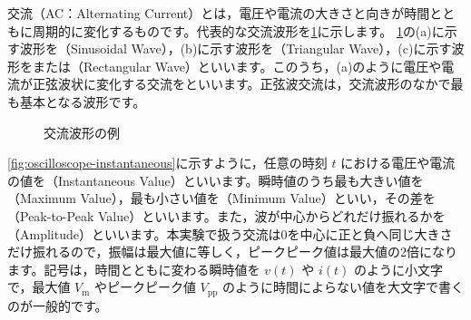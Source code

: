 交流（AC：Alternating Current）とは，電圧や電流の大きさと向きが時間とともに周期的に変化するものです。代表的な交流波形を\cref{fig:oscilloscope-waveforms}に示します。
\cref{fig:oscilloscope-waveforms}の(a)に示す波形を（Sinusoidal Wave），(b)に示す波形を（Triangular Wave），(c)に示す波形をまたは（Rectangular Wave）といいます。このうち，(a)のように電圧や電流が正弦波状に変化する交流をといいます。正弦波交流は，交流波形のなかで最も基本となる波形です。

\begin{figure}[htbp]
  \centering
  \caption{交流波形の例}
  \label{fig:oscilloscope-waveforms}
\end{figure}

\cref{fig:oscilloscope-instantaneous}に示すように，任意の時刻 $t$ における電圧や電流の値を（Instantaneous Value）といいます。瞬時値のうち最も大きい値を（Maximum Value），最も小さい値を（Minimum Value）といい，その差を（Peak-to-Peak Value）といいます。また，波が中心からどれだけ振れるかを（Amplitude）といいます。本実験で扱う交流は0を中心に正と負へ同じ大きさだけ振れるので，振幅は最大値に等しく，ピークピーク値は最大値の2倍になります。記号は，時間とともに変わる瞬時値を $v(t)$ や $i(t)$ のように小文字で，最大値 $V_\mathrm{m}$ やピークピーク値 $V_\mathrm{pp}$ のように時間によらない値を大文字で書くのが一般的です。

